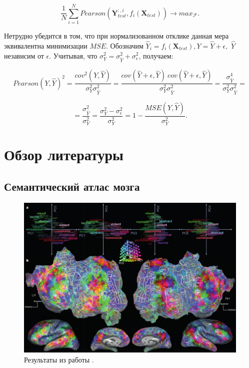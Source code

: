 \documentclass[pdftex,ptm,12pt,a4paper]{report}
\theoremstyle{definition}
\begin{document}
$$\frac{1}{N} \sum_{i=1}^{N} Pearson(\textbf{Y}_{test}^{:,i}, f_{i}(\textbf{X}_{test})) \rightarrow max_{\mathcal{F}}.$$

Нетрудно убедится в том, что при нормализованном отклике данная мера эквивалентна минимизации $MSE$. Обозначим $\hat{Y}_i = f_i(\mathbf{X}_{test}), Y = \hat{Y} + \epsilon,$ $\hat{Y}$ независим от $\epsilon$. Учитывая, что $\sigma^2_{Y} = \sigma^2_{\hat{Y}} + \sigma^2_{\epsilon}$, получаем:

$$Pearson(Y, \hat{Y})^2 = \frac{cov^2(Y, \hat{Y})}{\sigma^2_{Y}\sigma^2_{\hat{Y}}} =  \frac{cov(\hat{Y} + \epsilon, \hat{Y})\ cov(\hat{Y} + \epsilon, \hat{Y})}{\sigma^2_{Y}\sigma^2_{\hat{Y}}} = \frac{\sigma^4_{\hat{Y}}}{\sigma^2_{Y}\sigma^2_{\hat{Y}}} = $$

$$= \frac{\sigma^2_{\hat{Y}}}{\sigma^2_{Y}} = \frac{\sigma^2_{Y} - \sigma^2_{\epsilon}}{\sigma^2_{Y}} = 1 - \frac{MSE(Y, \hat{Y})}{\sigma^2_{Y}}.$$


\chapter{Обзор литературы}
\section{Семантический атлас мозга}\label{complex}

\begin{figure}[h]
\includegraphics[scale=0.4]{images/galant_results.png}
\centering
\caption{Результаты из работы \cite{huth2016natural}.}
\label{huth_result}
\end{figure}
\end{document}
